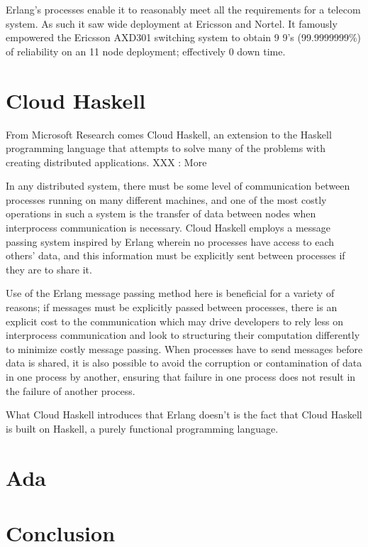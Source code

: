 \documentclass[10pt,a4paper,twocolumn]{article}
\begin{document}
Erlang's processes enable it to reasonably meet all the requirements for a
telecom system. As such it saw wide deployment at Ericsson and Nortel. It
famously empowered the Ericsson AXD301 switching system to obtain 9 9's
(99.9999999\%) of reliability on an 11 node deployment; effectively 0 down time.
\cite{erlangthesis}




\section{Cloud Haskell}

From Microsoft Research comes Cloud Haskell, an extension to the Haskell
programming language that attempts to solve many of the problems with creating
distributed applications. XXX : More

In any distributed system, there must be some level of communication between
processes running on many different machines, and one of the most costly
operations in such a system is the transfer of data between nodes when
interprocess communication is necessary. Cloud Haskell employs a message passing
system inspired by Erlang wherein no processes have access to each others' data,
and this information must be explicitly sent between processes if they are to
share it.

Use of the Erlang message passing method here is beneficial for a variety of
reasons; if messages must be explicitly passed between processes, there is an
explicit cost to the communication which may drive developers to rely less on
interprocess communication and look to structuring their computation differently
to minimize costly message passing. When processes have to send messages before
data is shared, it is also possible to avoid the corruption or contamination of
data in one process by another, ensuring that failure in one process does not
result in the failure of another process.

What Cloud Haskell introduces that Erlang doesn't is the fact that Cloud Haskell
is built on Haskell, a purely functional programming language.



\section{Ada}



\section{Conclusion}





\small



\end{document}

